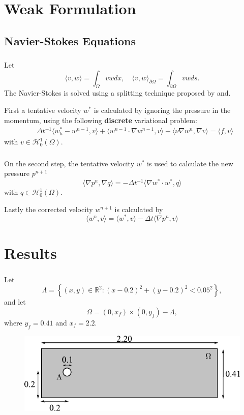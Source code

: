 \documentclass{beamer}
\theoremstyle{definition}
\theoremstyle{remark}
\theoremstyle{example}
\newif\ifinsection
\newif\ifinsubsection
\let\oldsection\section
\renewcommand{\section}{
  \global\insectiontrue
  \global\insubsectionfalse
  \oldsection}
\let\oldsubsection\subsection
\renewcommand{\subsection}{
  \global\insubsectiontrue
  \oldsubsection}
\newcommand {\aframe}[1] {
  \begin{frame}
    \ifinsection\frametitle{\secname}\fi
    \ifinsubsection\framesubtitle{\subsecname}\fi
  #1
  \end{frame}
}
\begin{document}
\section{Weak Formulation}


\subsection{Navier-Stokes Equations}
\aframe{Let
  \begin{equation*}
    \langle v, w \rangle = \int_{\Omega} vw dx, \quad
    \langle v, w \rangle_{\partial \Omega} = \int_{\partial \Omega} vw ds.
  \end{equation*}
  The Navier-Stokes is solved using a splitting technique proposed
  by\textcite{chorin1968} and\textcite{temam1969}. \vspace{0.5cm} \pause

  First a tentative velocity $w^{*}$ is calculated by ignoring the
  pressure in the momentum, using the following
  \textbf{discrete} variational problem:
  \begin{align*}
    &\Delta t^{-1}\langle w^*_h-w^{n-1}, v\rangle +
      \langle w^{n-1}\cdot\nabla w^{n-1}, v\rangle +
      \langle\nu\nabla w^{n},\nabla v\rangle=\langle f,v\rangle
  \end{align*}
  with $v \in \mathcal{H}_{0}^{1}(\Omega)$.
}

\aframe{On the second step, the tentative velocity $w^{*}$ is used to calculate
  the new pressure $p^{n + 1}$
  \begin{equation*}
    \langle \nabla p^{n},\nabla q\rangle = -\Delta t^{-1}\langle\nabla
      w^*\cdot w^*, q\rangle
  \end{equation*}
  with $q \in \mathcal{H}_{0}^{1}(\Omega)$. \vspace{0.5cm} \pause

  Lastly the corrected velocity $w^{n+1}$ is calculated by
  \begin{equation*}
    \langle w^{n}, v \rangle = \langle w^{*}, v \rangle - \Delta t
    \langle \nabla p^n, v \rangle
  \end{equation*}
}


\section{Results}
\aframe{
Let \[\Lambda=\left\{(x,y)\in\mathbb{R}^2:(x-0.2)^2 + (y-0.2)^2 <
 0.05^2\right\},\] and let \[\Omega=(0,x_f)
 \times(0,y_f) - \Lambda,\] where $y_f=0.41$ and $x_f=2.2$.
 \vspace{0.5cm}
 \begin{figure}
   \centering
   \includegraphics[scale=1]{figs/region.pdf}
 \end{figure}
}
\end{document}
